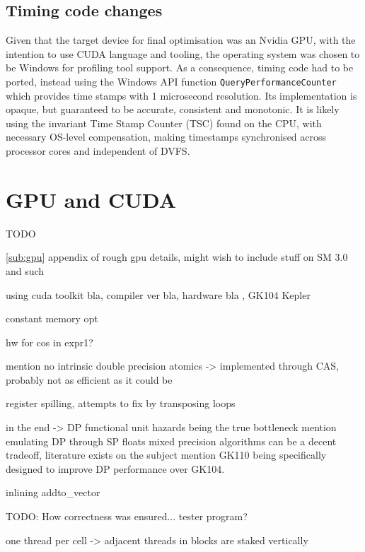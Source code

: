 \documentclass[11pt, oneside, a4paper]{article}
\begin{document}
\subsection{Timing code changes} %
\label{sub:timing_code_changes}
Given that the target device for final optimisation was an Nvidia GPU, with the intention to use CUDA language and tooling, the operating system was chosen to be Windows for profiling tool support. As a consequence, timing code had to be ported, instead using the Windows API function \texttt{QueryPerformanceCounter} which provides time stamps with 1 microsecond resolution. Its implementation is opaque, but guaranteed to be accurate, consistent and monotonic. It is likely using the invariant Time Stamp Counter (TSC) found on the CPU, with necessary OS-level compensation, making timestamps synchronised across processor cores and independent of DVFS.





\section{GPU and CUDA} %
\label{sec:gpu_and_cuda}

TODO

\ref{sub:gpu} appendix of rough gpu details, might wish to include stuff on SM 3.0 and such

using cuda toolkit bla, compiler ver bla, hardware bla , GK104 Kepler

constant memory opt

hw for cos in expr1? 

mention no intrinsic double precision atomics -> implemented through CAS, probably not as efficient as it could be

register spilling, attempts to fix by transposing loops

in the end -> DP functional unit hazards being the true bottleneck
mention emulating DP through SP floats
mixed precision algorithms can be a decent tradeoff, literature exists on the subject
mention GK110 being specifically designed to improve DP performance over GK104.

inlining addto\_vector

TODO: How correctness was ensured... tester program?

one thread per cell -> adjacent threads in blocks are staked vertically
\end{document}
